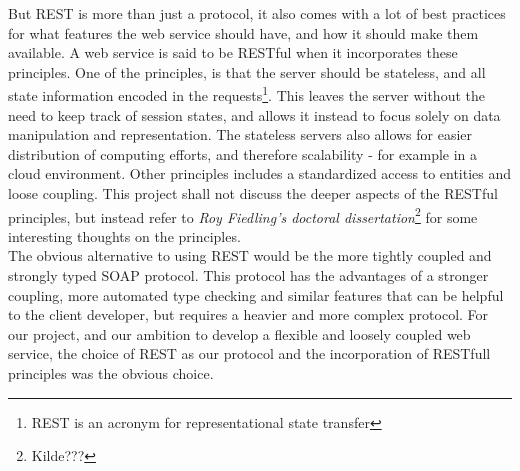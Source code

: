 \documentclass[10pt,a4paper]{article}
\begin{document}
But REST is more than just a protocol, it also comes with a lot of best practices for what features the web service should have, and how it should make them available. A web service is said to be RESTful when it incorporates these principles. One of the principles, is that the server should be stateless, and all state information encoded in the requests\footnote{REST is an acronym for representational state transfer}. This leaves the server without the need to keep track of session states, and allows it instead to focus solely on data manipulation and representation. The stateless servers also allows for easier distribution of computing efforts, and therefore scalability - for example in a cloud environment. Other principles includes a standardized access to entities and loose coupling. This project shall not discuss the deeper aspects of the RESTful principles, but instead refer to \emph{Roy Fiedling’s doctoral dissertation}\footnote{Kilde???} for some interesting thoughts on the principles. \\

The obvious alternative to using REST would be the more tightly coupled and strongly typed SOAP protocol. This protocol has the advantages of a stronger coupling, more automated type checking and similar features that can be helpful to the client developer, but requires a heavier and more complex protocol. For our project, and our ambition to develop a flexible and loosely coupled web service, the choice of REST as our protocol and the incorporation of RESTfull principles was the obvious choice.
\end{document}
